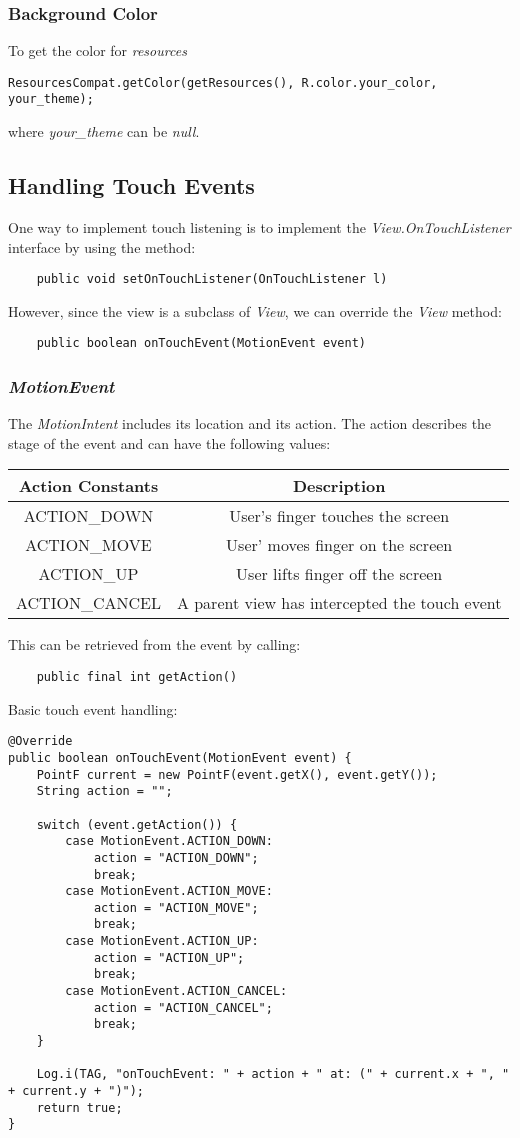 \documentclass[]{article}
\renewcommand{\it}[1]{\textit{#1}}
\begin{document}
\subsubsection{Background Color}
To get the color for \it{resources}
\begin{lstlisting}
ResourcesCompat.getColor(getResources(), R.color.your_color, your_theme);
\end{lstlisting}
where \it{your\_theme} can be \it{null}.

\subsection{Handling Touch Events}
One way to implement touch listening is to implement the \it{View.OnTouchListener} interface by using the method:
\begin{lstlisting}
	public void setOnTouchListener(OnTouchListener l)
\end{lstlisting}
However, since the view is a subclass of \it{View}, we can override the \it{View} method:
\begin{lstlisting}
	public boolean onTouchEvent(MotionEvent event) 
\end{lstlisting}

\subsubsection{\it{MotionEvent}}
The \it{MotionIntent} includes its location and its action.  The action describes the stage of the event and can have the following values:
\begin{center}
	\begin{tabular}{| c | c |} 
		\hline
		Action Constants  & Description  \\ [0.5ex] 
		\hline 
		ACTION\_DOWN & User's finger touches the screen   \\ [1ex]
		ACTION\_MOVE & User' moves finger on the screen   \\ [1ex]
		ACTION\_UP & User lifts finger off the screen  \\ [1ex]
		ACTION\_CANCEL & A parent view has intercepted the touch event   \\  [1ex] 
		\hline
	\end{tabular}
\end{center}
This can be retrieved from the event by calling:
\begin{lstlisting}
	public final int getAction()
\end{lstlisting}
Basic touch event handling:
\begin{lstlisting}
@Override
public boolean onTouchEvent(MotionEvent event) {
	PointF current = new PointF(event.getX(), event.getY());
	String action = "";
	
	switch (event.getAction()) {
		case MotionEvent.ACTION_DOWN:
			action = "ACTION_DOWN";
			break;
		case MotionEvent.ACTION_MOVE:
			action = "ACTION_MOVE";
			break;
		case MotionEvent.ACTION_UP:
			action = "ACTION_UP";
			break;
		case MotionEvent.ACTION_CANCEL:
			action = "ACTION_CANCEL";
			break;
	}
	
	Log.i(TAG, "onTouchEvent: " + action + " at: (" + current.x + ", " + current.y + ")");
	return true;
}
\end{lstlisting}
\end{document}
